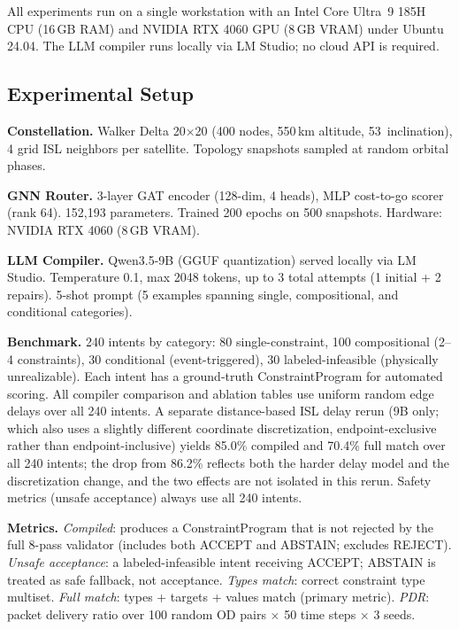 \documentclass[10pt, conference, letterpaper]{IEEEtran}
\newcommand{\decision}[1]{\textsf{\MakeUppercase{#1}}}
\begin{document}
All experiments run on a single workstation with an Intel Core Ultra~9
185H CPU (16\,GB RAM) and NVIDIA RTX 4060 GPU (8\,GB VRAM) under
Ubuntu 24.04. The LLM compiler runs locally via LM Studio; no cloud
API is required.

\subsection{Experimental Setup}
\label{sec:setup}

\textbf{Constellation.} Walker Delta 20$\times$20 (400 nodes, 550\,km
altitude, 53\textdegree\ inclination), 4 grid ISL neighbors per
satellite. Topology snapshots sampled at random orbital phases.

\textbf{GNN Router.} 3-layer GAT encoder (128-dim, 4 heads), MLP
cost-to-go scorer (rank 64). 152,193 parameters. Trained 200 epochs
on 500 snapshots. Hardware: NVIDIA RTX 4060 (8\,GB VRAM).

\textbf{LLM Compiler.} Qwen3.5-9B (GGUF quantization) served locally
via LM Studio. Temperature 0.1, max 2048 tokens, up to 3 total
attempts (1 initial + 2 repairs). 5-shot prompt (5 examples spanning single, compositional,
and conditional categories).

\textbf{Benchmark.} 240 intents by category: 80 single-constraint,
100 compositional (2--4 constraints), 30 conditional (event-triggered),
30 labeled-infeasible (physically unrealizable). Each intent has a
ground-truth ConstraintProgram for automated scoring. All compiler
comparison and ablation tables use uniform random edge delays over
all 240 intents. A separate distance-based ISL delay rerun (9B only;
which also uses a slightly different coordinate discretization,
endpoint-exclusive rather than endpoint-inclusive) yields 85.0\% compiled and 70.4\% full
match over all 240 intents; the drop from 86.2\% reflects both the
harder delay model and the discretization change, and the two effects
are not isolated in this rerun.
Safety metrics (unsafe acceptance) always use all 240 intents.

\textbf{Metrics.} \textit{Compiled}: produces a ConstraintProgram that
is not rejected by the full 8-pass validator (includes both
\decision{Accept} and \decision{Abstain}; excludes \decision{Reject}).
\textit{Unsafe acceptance}: a labeled-infeasible intent receiving
\decision{Accept}; \decision{Abstain} is treated as safe fallback,
not acceptance.
\textit{Types match}: correct constraint type multiset.
\textit{Full match}: types + targets + values match (primary metric).
\textit{PDR}: packet delivery ratio over 100 random OD pairs $\times$
50 time steps $\times$ 3 seeds.
\end{document}
